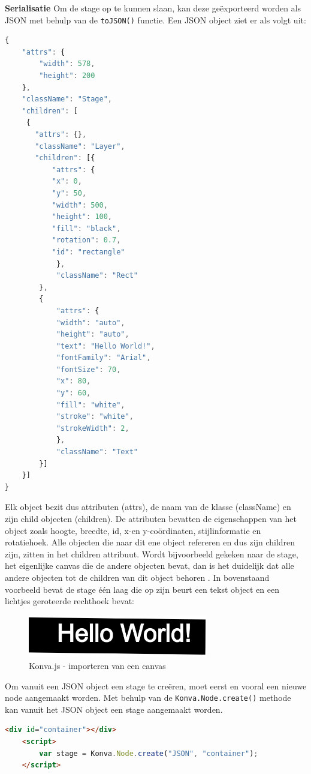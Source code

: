 \textbf{Serialisatie} \break
Om de stage op te kunnen slaan, kan deze ge\"{e}xporteerd worden als JSON met behulp van de \texttt{toJSON()} functie. Een JSON object ziet er als volgt uit:

\begin{lstlisting}[language=javascript]
{
	"attrs": {
	 	"width": 578,
	 	"height": 200
	},
	"className": "Stage",
	"children": [
	 {
	   "attrs": {},
	   "className": "Layer",
	   "children": [{
		   "attrs": {
		   "x": 0,
		   "y": 50,
		   "width": 500,
		   "height": 100,
		   "fill": "black",
		   "rotation": 0.7,
		   "id": "rectangle"
	   		},
	  		"className": "Rect"
   		},
   		{
			"attrs": {
			"width": "auto",
			"height": "auto",
			"text": "Hello World!",
			"fontFamily": "Arial",
			"fontSize": 70,
			"x": 80,
			"y": 60,
			"fill": "white",
			"stroke": "white",
			"strokeWidth": 2,
	   		},
   			"className": "Text"
		}]
 	}]
}
\end{lstlisting}

Elk object bezit dus attributen (attrs), de naam van de klasse (className) en zijn child objecten (children).  De attributen bevatten de eigenschappen van het object zoals hoogte, breedte, id, x-en y-co\"{o}rdinaten, stijlinformatie en rotatiehoek. Alle objecten die naar dit ene object refereren en dus zijn children zijn, zitten in het children attribuut. Wordt bijvoorbeeld gekeken naar de stage, het eigenlijke canvas die de andere objecten bevat, dan is het duidelijk dat alle andere objecten tot de children van dit object behoren \cite{KonvaSerialize}. In bovenstaand voorbeeld bevat de stage \'{e}\'{e}n laag die op zijn beurt een tekst object en een lichtjes geroteerde rechthoek bevat: %

\begin{figure}[H]
	\centering
	\includegraphics[width=0.7\textwidth]{Figuren/KonvaJSLoadFromJSON.png}
	\caption{Konva.js - importeren van een canvas} 
	\label{fig:KonvaJSLoadFromJSON}
\end{figure} 

Om vanuit een JSON object een stage te cre\"{e}ren, moet eerst en vooral een nieuwe node aangemaakt worden. Met behulp van de \texttt{Konva.Node.create()} methode kan vanuit het JSON object een stage aangemaakt worden. 
\begin{lstlisting}[language=HTML]
	<div id="container"></div>
	<script>
		var stage = Konva.Node.create("JSON", "container");
	</script>
\end{lstlisting}

